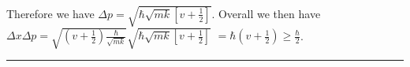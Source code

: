 \begin{enumerate}
Therefore we have $\Delta p = \sqrt{\hbar\sqrt{mk}\left[v + \frac{1}{2}\right]}$. Overall we then have $\Delta x\Delta p = \sqrt{\left(v + \frac{1}{2}\right)\frac{\hbar}{\sqrt{mk}}}\sqrt{\hbar\sqrt{mk}\left[v + \frac{1}{2}\right]}$ $= \hbar(v + \frac{1}{2})\ge \frac{\hbar}{2}$.

\end{enumerate}

\hrule\vspace{0.5cm}
